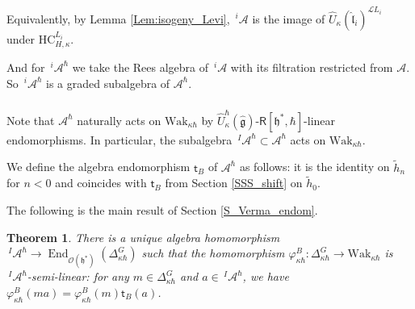 \documentclass{amsart}
\newtheorem{Thm}{Theorem}[subsection]
\theoremstyle{definition}
\newcommand{\sss}{\subsubsection{}}
\newcommand{\on}{\mathrm}
\newcommand{\Ring}{\mathsf{R}}
\newcommand{\hg}{\hat{\mathfrak{g}}}
\newcommand{\h}{\mathfrak{h}}
\newcommand{\HC}{\mathrm{HC}} %
\newcommand{\Wak}{\on{Wak}}
\newcommand{\lf}{\mathfrak{l}}
\newcommand{\A}{\mathscr{A}}
\newcommand{\Loop}{\mathscr{L}}
\newcommand{\sO}{\mathscr{O}}
\numberwithin{equation}{section}
\begin{document}
Equivalently, by Lemma \ref{Lem:isogeny_Levi},  $\,^i\A$ is the image of $\widehat{U}_\kappa(\hat{\lf}_i)^{\Loop L_i}$ under $\HC_{H,\kappa}^{L_i}$. 



And for $\,^i\!\A^\hbar$ we take the Rees algebra of $\,^i\!\A$ with its filtration restricted from $\A$. So $\,^i\!\A^\hbar$ is a graded subalgebra of $\A^\hbar$.

\sss
Note that $\A^\hbar$ naturally acts on $\Wak_{\kappa\hbar}$ by $\widehat{U}^\hbar_{\kappa}(\hg)$-$\Ring[\h^*,\hbar]$-linear endomorphisms. In particular, the subalgebra $\,^I\A^\hbar\subset \A^\hbar$ acts on $\Wak_{\kappa\hbar}$. 

We define the algebra endomorphism $\mathsf{t}_B$ of $\A^\hbar$ as follows: it is the identity on $\tilde{h}_n$ for $n<0$ and coincides with $\mathsf{t}_B$ from Section \ref{SSS_shift} on $\tilde{h}_0$.



The following is the main result of  Section \ref{S_Verma_endom}. 

\begin{Thm}\label{Thm:Verma_endomorphisms}
There is a unique algebra homomorphism $\,^I\!\A^\hbar\rightarrow \operatorname{End}_{\sO(\h^*)}(\Delta^G_{\kappa\hbar})$ such that the homomorphism $\varphi^B_{\kappa\hbar}: \Delta^G_{\kappa\hbar}\rightarrow \Wak_{\kappa\hbar}$ is $\,^I\!\A^\hbar$-semi-linear: for any $m\in \Delta^G_{\kappa\hbar}$ and $a\in \,^I\!\A^\hbar$, we have 
$\varphi^B_{\kappa\hbar}(ma)=\varphi^B_{\kappa\hbar}(m)\mathsf{t}_B(a)$. 
\end{Thm}
\end{document}
